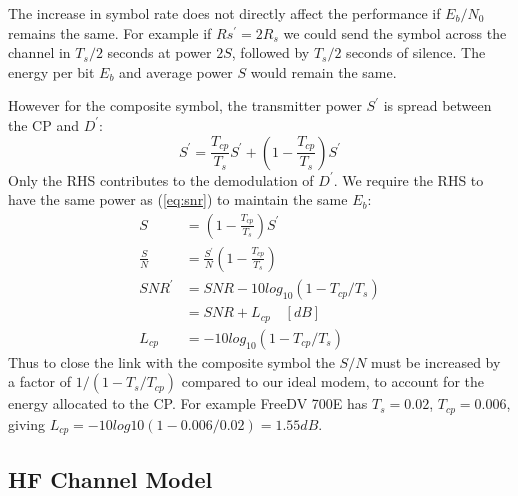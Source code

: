 \documentclass{article}
\begin{document}
The increase in symbol rate does not directly affect the performance if $E_b/N_0$ remains the same. For example if $Rs^\prime=2R_s$ we could send the symbol across the channel in $T_s/2$ seconds at power $2S$, followed by $T_s/2$ seconds of silence.  The energy per bit $E_b$ and average power $S$ would remain the same.

However for the composite symbol, the transmitter power $S^\prime$ is spread between the CP and $D^\prime$: 
\begin{equation}
S^\prime = \frac{T_{cp}}{T_s}S^\prime + \left(1 - \frac{T_{cp}}{T_s} \right)S^\prime
\end{equation}
Only the RHS contributes to the demodulation of $D^\prime$.  We require the RHS to have the same power as (\ref{eq:snr}) to maintain the same $E_b$:
\begin{equation}
\begin{split}
S           &= \left(1 - \frac{T_{cp}}{T_s} \right)S^\prime \\
\frac{S}{N} &= \frac{S^\prime}{N}\left(1 - \frac{T_{cp}}{T_s}\right) \\
SNR^\prime  &= SNR - 10log_{10}(1-T_{cp}/T_s) \\
            &= SNR + L_{cp} \quad [\si{dB}] \\
     L_{cp} &= -10log_{10}(1-T_{cp}/T_s)    
\end{split}
\end{equation}
Thus to close the link with the composite symbol the $S/N$ must be increased by a factor of $1/(1 - {T_s}/T_{cp})$ compared to our ideal modem, to account for the energy allocated to the CP.  For example FreeDV 700E has $T_s=0.02$, $T_{cp}=0.006$, giving $L_{cp}=-10log10(1-0.006/0.02)=1.55 \si{dB}$.

\subsection{HF Channel Model}
\end{document}
